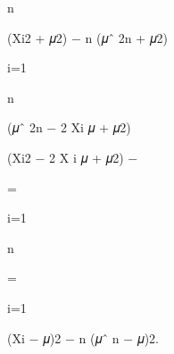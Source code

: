 \documentclass[a4paper,portrait,12pt]{article}
\begin{document}
\begin{flushleft}
n
\end{flushleft}





\begin{flushleft}
(Xi2 + 𝜇2) $-$ n (𝜇ˆ 2n + 𝜇2)
\end{flushleft}





\begin{flushleft}
i=1
\end{flushleft}





\begin{flushleft}
n
\end{flushleft}





\begin{flushleft}
(𝜇ˆ 2n $-$ 2 Xi 𝜇 + 𝜇2)
\end{flushleft}





\begin{flushleft}
(Xi2 $-$ 2 X i 𝜇 + 𝜇2) $-$
\end{flushleft}





=


\begin{flushleft}
i=1
\end{flushleft}


\begin{flushleft}
n
\end{flushleft}





=





\begin{flushleft}
i=1
\end{flushleft}





\begin{flushleft}
(Xi $-$ 𝜇)2 $-$ n (𝜇ˆ n $-$ 𝜇)2.
\end{flushleft}
\end{document}
